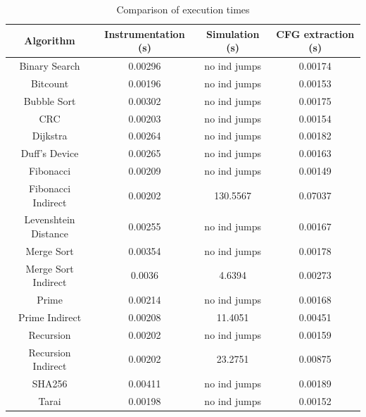\begin{table}
  \centering
  \begin{tabular}{|c|c|c|c|}
    \hline
    \textbf{Algorithm}   & \textbf{Instrumentation (s)} & \textbf{Simulation (s)} & \textbf{CFG extraction (s)} \\
    \hline
    Binary Search        & 0.00296                      & no ind jumps            & 0.00174                     \\
    \hline
    Bitcount             & 0.00196                      & no ind jumps            & 0.00153                     \\
    \hline
    Bubble Sort          & 0.00302                      & no ind jumps            & 0.00175                     \\
    \hline
    CRC                  & 0.00203                      & no ind jumps            & 0.00154                     \\
    \hline
    Dijkstra             & 0.00264                      & no ind jumps            & 0.00182                     \\
    \hline
    Duff's Device        & 0.00265                      & no ind jumps            & 0.00163                     \\
    \hline
    Fibonacci            & 0.00209                      & no ind jumps            & 0.00149                     \\
    \hline
    Fibonacci Indirect   & 0.00202                      & 130.5567                & 0.07037                     \\
    \hline
    Levenshtein Distance & 0.00255                      & no ind jumps            & 0.00167                     \\
    \hline
    Merge Sort           & 0.00354                      & no ind jumps            & 0.00178                     \\
    \hline
    Merge Sort Indirect  & 0.0036                       & 4.6394                  & 0.00273                     \\
    \hline
    Prime                & 0.00214                      & no ind jumps            & 0.00168                     \\
    \hline
    Prime Indirect       & 0.00208                      & 11.4051                 & 0.00451                     \\
    \hline
    Recursion            & 0.00202                      & no ind jumps            & 0.00159                     \\
    \hline
    Recursion Indirect   & 0.00202                      & 23.2751                 & 0.00875                     \\
    \hline
    SHA256               & 0.00411                      & no ind jumps            & 0.00189                     \\
    \hline
    Tarai                & 0.00198                      & no ind jumps            & 0.00152                     \\
    \hline
  \end{tabular}
  \caption{Comparison of execution times}
  \label{tab:othertimes}
\end{table}

